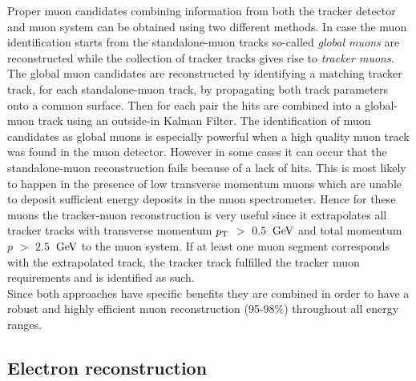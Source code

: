 Proper muon candidates combining information from both the tracker detector and muon system can be obtained using two different methods. In case the muon identification starts from the standalone-muon tracks so-called \textit{global muons} are reconstructed while the collection of tracker tracks gives rise to \textit{tracker muons}.
The global muon candidates are reconstructed by identifying a matching tracker track, for each standalone-muon track, by propagating both track parameters onto a common surface. Then for each pair the hits are combined into a global-muon track using an outside-in Kalman Filter. The identification of muon candidates as global muons is especially powerful when a high quality muon track was found in the muon detector. However in some cases it can occur that the standalone-muon reconstruction fails because of a lack of hits. This is most likely to happen in the presence of low transverse momentum muons which are unable to deposit sufficient energy deposits in the muon spectrometer. Hence for these muons the tracker-muon reconstruction is very useful since it extrapolates all tracker tracks with transverse momentum $p_{\rm T}$ $>$ $0.5$ $\, \mathrm{GeV}$ and total momentum $p$ $>$ $2.5$ $\, \mathrm{GeV}$ to the muon system. If at least one muon segment corresponds with the extrapolated track, the tracker track fulfilled the tracker muon requirements and is identified as such.
\\
Since both approaches have specific benefits they are combined in order to have a robust and highly efficient muon reconstruction (95-98$\%$) throughout all energy ranges. 
 
\subsection{Electron reconstruction} \label{subsec::Electron}

